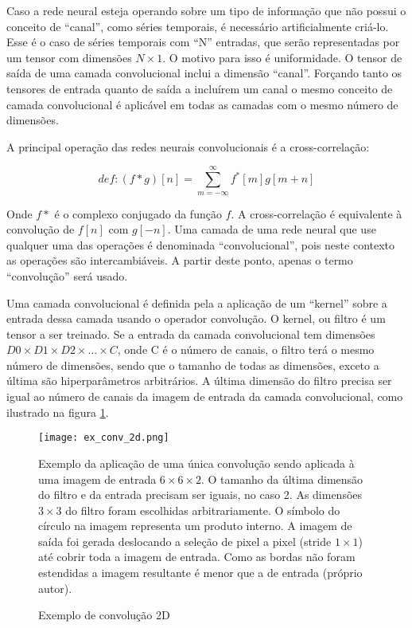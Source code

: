 Caso a rede neural esteja operando sobre um tipo de informação que não possui o
conceito de “canal”, como séries temporais, é necessário artificialmente
criá-lo. Esse é o caso de séries temporais com “N” entradas, que serão
representadas por um tensor com dimensões $N\times1$. O motivo para isso é
uniformidade. O tensor de saída de uma camada convolucional inclui a dimensão
“canal”. Forçando tanto os tensores de entrada quanto de saída a incluírem um
canal o mesmo conceito de camada convolucional é aplicável em todas as camadas
com o mesmo número de dimensões.

A principal operação das redes neurais convolucionais é a cross-correlação:

\begin{equation}
	def: (f * g)[n] = \sum_{m=-\infty}^{\infty} f^*[m]g[m+n]
\end{equation}

Onde $f*$ é o complexo conjugado da função $f$. A cross-correlação é
equivalente à convolução de $f[n]$ com $g[-n]$. Uma camada de uma rede
neural que use qualquer uma das operações é denominada “convolucional”,
pois neste contexto as operações são intercambiáveis. A partir deste
ponto, apenas o termo “convolução” será usado.

Uma camada convolucional é definida pela a aplicação de um “kernel” sobre a
entrada dessa camada usando o operador convolução. O kernel, ou filtro é um
tensor a ser treinado. Se a entrada da camada convolucional tem dimensões
$D0 \times D1 \times D2 \times ... \times C$, onde C é o número de canais,
o filtro terá o mesmo número de dimensões, sendo que o tamanho de todas
as dimensões, exceto a última são
hiperparâmetros arbitrários. A última dimensão do filtro precisa ser igual ao
número de canais da imagem de entrada da camada convolucional, como ilustrado na
figura \ref{fig:ex_conv_2d}.


\begin{figure}[!htb]
	\centering
	\texttt{[image: ex\_conv\_2d.png]}
	\caption{Exemplo de convolução 2D}
	\label{fig:ex_conv_2d}
	Exemplo da aplicação de uma única convolução sendo aplicada à uma imagem de
	entrada $6 \times 6 \times 2$. O tamanho da última dimensão do filtro e
	da entrada precisam ser iguais, no caso 2. As dimensões $3 \times 3$ do
	filtro foram escolhidas arbitrariamente. O símbolo do círculo na imagem
	representa um produto interno. A imagem de saída foi gerada deslocando
	a seleção de pixel a pixel (stride $1 \times 1$) até cobrir toda a
	imagem de entrada. Como as bordas não foram estendidas a imagem
	resultante é menor que a de entrada (próprio autor).
\end{figure}

